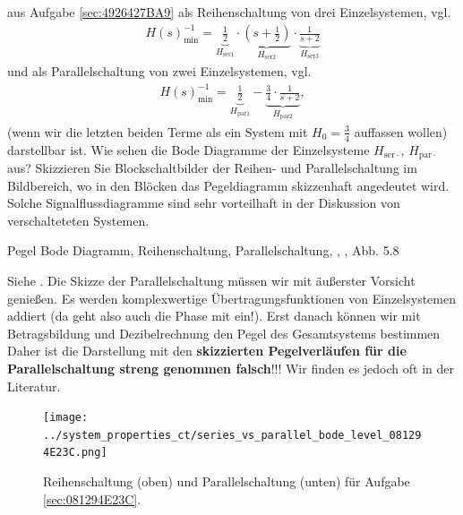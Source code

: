 aus Aufgabe \ref{sec:4926427BA9}
als Reihenschaltung von drei Einzelsystemen, vgl. 
\begin{align}
H(s)_\mathrm{min}^{-1} = \underbrace{\frac{1}{2}}_{H_{\mathrm{ser}1}} \cdot \underbrace{(s+\frac{1}{2})}_{H_{\mathrm{ser}2}} \cdot \underbrace{\frac{1}{s+2}}_{H_{\mathrm{ser}3}}
\end{align}
und als Parallelschaltung von zwei Einzelsystemen, vgl. 
\begin{align}
H(s)_\mathrm{min}^{-1} = \underbrace{\frac{1}{2}}_{H_{\mathrm{par}1}} - \underbrace{\frac{3}{4}\cdot\frac{1}{s+2}}_{H_\mathrm{par2}},
\end{align}
(wenn wir die letzten beiden Terme als ein System mit $H_0=\frac{3}{4}$ auffassen
wollen) darstellbar ist.
%
Wie sehen die Bode Diagramme der Einzelsysteme $H_{\mathrm{ser}\cdot}$,
$H_{\mathrm{par}\cdot}$ aus?
%
Skizzieren Sie Blockschaltbilder der Reihen- und Parallelschaltung im Bildbereich,
wo in den Blöcken das Pegeldiagramm skizzenhaft angedeutet wird.
Solche Signalflussdiagramme sind sehr vorteilhaft in der Diskussion von
verschalteteten Systemen.

\begin{Werkzeug}
Pegel Bode Diagramm, Reihenschaltung, Parallelschaltung,
, , Abb. 5.8
\end{Werkzeug}
\begin{Loesung}
Siehe .
Die Skizze der Parallelschaltung müssen wir mit äußerster Vorsicht genießen.
Es werden komplexwertige Übertragungsfunktionen von Einzelsystemen addiert
(da geht also auch die Phase mit ein!). Erst danach können wir mit
Betragsbildung und Dezibelrechnung den Pegel des Gesamtsystems bestimmen
Daher ist die Darstellung mit den \textbf{skizzierten Pegelverläufen für die
Parallelschaltung streng genommen falsch}!!!
Wir finden es jedoch oft in der Literatur.
\end{Loesung}

\begin{figure}[h]
\centering
\texttt{[image: ../system\_properties\_ct/series\_vs\_parallel\_bode\_level\_081294E23C.png]}
\caption{Reihenschaltung (oben) und Parallelschaltung (unten) für
Aufgabe \ref{sec:081294E23C}.}
\label{fig:series_vs_parallel_bode_level_081294E23C}
\end{figure}


